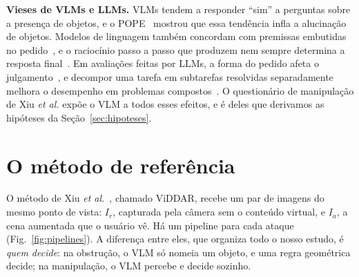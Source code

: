 \documentclass[conference]{IEEEtran}
\newcommand{\Ir}{I_r}
\newcommand{\Ia}{I_a}
\begin{document}
\textbf{Vieses de VLMs e LLMs.} VLMs tendem a responder ``sim'' a perguntas sobre a presença de
objetos, e o POPE~\cite{pope} mostrou que essa tendência infla a alucinação de objetos. Modelos de
linguagem também concordam com premissas embutidas no pedido~\cite{sharma2024}, e o raciocínio passo a
passo que produzem nem sempre determina a resposta final~\cite{turpin2023}. Em avaliações feitas por
LLMs, a forma do pedido afeta o julgamento~\cite{zheng2023}, e decompor uma tarefa em subtarefas
resolvidas separadamente melhora o desempenho em problemas compostos~\cite{khot2023}. O questionário de
manipulação de Xiu \emph{et al.} expõe o VLM a todos esses efeitos, e é deles que derivamos as hipóteses
da Seção~\ref{sec:hipoteses}.

\section{O método de referência}
\label{sec:viddar}

O método de Xiu \emph{et al.}~\cite{viddar}, chamado ViDDAR, recebe um par de imagens do mesmo ponto de
vista: $\Ir$, capturada pela câmera sem o conteúdo virtual, e $\Ia$, a cena aumentada que o usuário vê.
Há um pipeline para cada ataque (Fig.~\ref{fig:pipelines}). A diferença entre eles, que organiza todo o
nosso estudo, é \emph{quem decide}: na obstrução, o VLM só nomeia um objeto, e uma regra geométrica
decide; na manipulação, o VLM percebe e decide sozinho.
\end{document}
